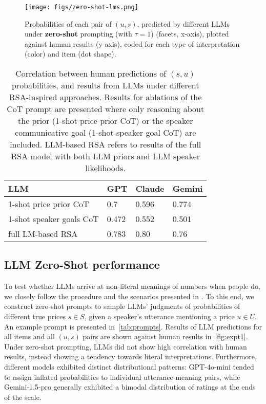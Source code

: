 \begin{figure*}[h!]
    \centering
    \texttt{[image: figs/zero-shot-lms.png]} 
    \caption{Probabilities of each pair of $(u, s)$, predicted by different LLMs under \textbf{zero-shot} prompting (with $\tau=1$) (facets, x-axis), plotted against human results (y-axis), coded for each type of interpretation (color) and item (dot shape).}
    \label{fig:expt1}
\end{figure*}

\begin{table}[h]
\centering
\begin{tabular}{llll}
\toprule
 \textbf{LLM} & GPT & Claude & Gemini \\ \midrule
 1-shot price prior CoT& 0.7  & 0.596 & 0.774 \\
 1-shot speaker goals CoT & 0.472 & 0.552 & 0.501 \\
 full LM-based RSA & 0.783  & 0.80 & 0.76 \\
 \bottomrule
\end{tabular}
\caption{Correlation between human predictions of $(s,u)$ probabilities, and results from LLMs under different RSA-inspired approaches. Results for ablations of the CoT prompt are presented where only reasoning about the prior (1-shot price prior CoT) or the speaker communicative goal (1-shot speaker goal CoT) are included. LLM-based RSA refers to results of the full RSA model with both LLM priors and LLM speaker likelihoods. \label{tab:gpt-prompting-comparison}}
\end{table}

\subsection{LLM Zero-Shot performance}
\label{sec:app:zero-shot}
To test whether LLMs arrive at non-literal meanings of
numbers when people do, we closely follow the procedure
and the scenarios presented in \citet{kao2014nonliteral}. To this end, we construct zero-shot prompts to sample LLMs' judgments of probabilities of different true prices $s \in S$, given a speaker's utterance mentioning a price $u \in U$. An example prompt is presented in~\autoref{tab:prompts}.
Results of LLM predictions for all items and all $(u,s)$ pairs are shown against human results in~\autoref{fig:expt1}. 
Under zero-shot prompting, LLMs did not show high correlation with human results, instead showing a tendency towards literal interpretations. 
Furthermore, different models exhibited distinct distributional patterns: GPT-4o-mini tended to assign inflated probabilities to individual utterance-meaning pairs, while Gemini-1.5-pro generally exhibited a bimodal distribution of ratings at the ends of the scale.

